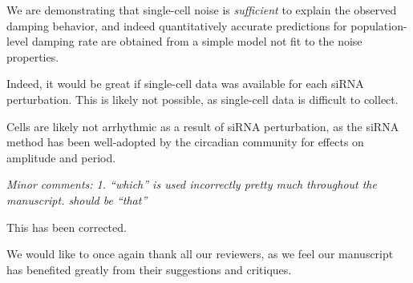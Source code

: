 \documentclass[11pt, letterpaper]{article}
\newenvironment{reviewer}{\itshape\color{gray}}{}
\begin{document}
We are demonstrating that single-cell noise is {\itshape sufficient} to explain the observed damping behavior, and indeed quantitatively accurate predictions for population-level damping rate are obtained from a simple model not fit to the noise properties.

Indeed, it would be great if single-cell data was available for each siRNA perturbation. This is likely not possible, as single-cell data is difficult to collect.

Cells are likely not arrhythmic as a result of siRNA perturbation, as the siRNA method has been well-adopted by the circadian community for effects on amplitude and period.

\begin{reviewer}
Minor comments:
1. ``which'' is used incorrectly pretty much throughout the manuscript. should be ``that''
\end{reviewer}

This has been corrected.


We would like to once again thank all our reviewers, as we feel our manuscript has benefited greatly from their suggestions and critiques.
\end{document}
